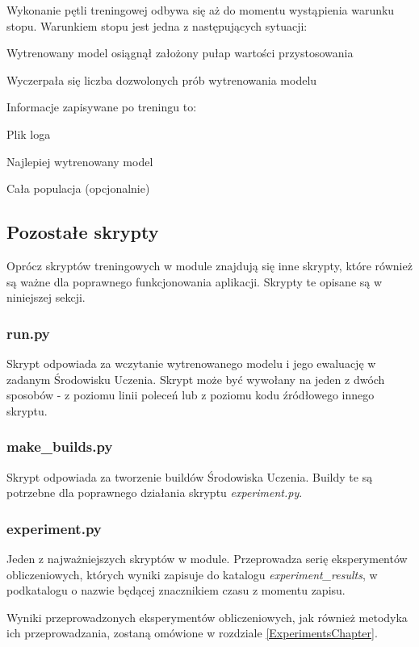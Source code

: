 Wykonanie pętli treningowej odbywa się aż do momentu wystąpienia warunku stopu. Warunkiem stopu jest jedna z następujących sytuacji:
\begin{enumerate*}
\item Wytrenowany model osiągnął założony pułap wartości przystosowania
\item Wyczerpała się liczba dozwolonych prób wytrenowania modelu
\end{enumerate*}
Informacje zapisywane po treningu to:
\begin{itemize*}
\item Plik loga
\item Najlepiej wytrenowany model
\item Cała populacja (opcjonalnie)
\end{itemize*}

\subsection{Pozostałe skrypty}
Oprócz skryptów treningowych w module znajdują się inne skrypty, które również są ważne dla poprawnego funkcjonowania aplikacji. Skrypty te opisane są w niniejszej sekcji.
\subsubsection{run.py}
Skrypt odpowiada za wczytanie wytrenowanego modelu i jego ewaluację w zadanym Środowisku Uczenia. Skrypt może być wywołany na jeden z dwóch sposobów - z poziomu linii poleceń lub z poziomu kodu źródłowego innego skryptu.

\subsubsection{make\_builds.py}
Skrypt odpowiada za tworzenie buildów Środowiska Uczenia. Buildy te są potrzebne dla poprawnego działania skryptu \textit{experiment.py}.

\subsubsection{experiment.py}
Jeden z najważniejszych skryptów w module. Przeprowadza serię eksperymentów obliczeniowych, których wyniki zapisuje do katalogu \textit{experiment\_results}, w podkatalogu o nazwie będącej znacznikiem czasu z momentu zapisu.

Wyniki przeprowadzonych eksperymentów obliczeniowych, jak również metodyka ich przeprowadzania, zostaną omówione w rozdziale \ref{ExperimentsChapter}.

